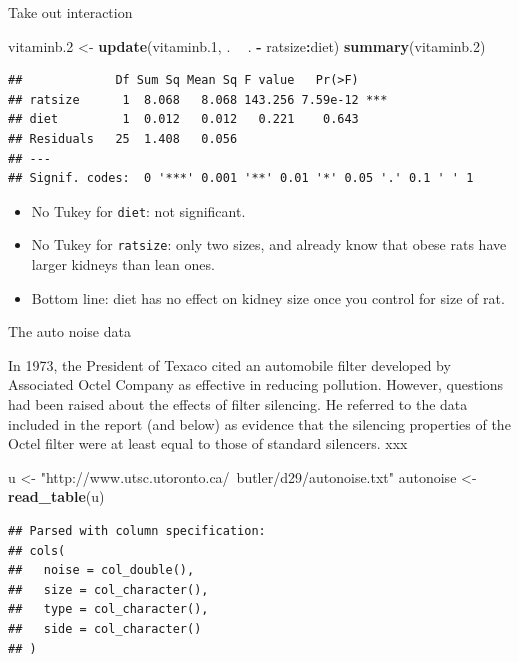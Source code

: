\documentclass[ignorenonframetext,]{beamer}
\newenvironment{Shaded}{\begin{snugshade}}{\end{snugshade}}
\newcommand{\FloatTok}[1]{\textcolor[rgb]{0.00,0.00,0.81}{#1}}
\newcommand{\KeywordTok}[1]{\textcolor[rgb]{0.13,0.29,0.53}{\textbf{#1}}}
\newcommand{\NormalTok}[1]{#1}
\newcommand{\OperatorTok}[1]{\textcolor[rgb]{0.81,0.36,0.00}{\textbf{#1}}}
\newcommand{\StringTok}[1]{\textcolor[rgb]{0.31,0.60,0.02}{#1}}
\begin{document}
\begin{frame}[fragile]{Take out interaction}
\protect\hypertarget{take-out-interaction}{}

\small

\begin{Shaded}
\begin{Highlighting}[]
\NormalTok{vitaminb}\FloatTok{.2}\NormalTok{ <-}\StringTok{ }\KeywordTok{update}\NormalTok{(vitaminb}\FloatTok{.1}\NormalTok{, . }\OperatorTok{~}\StringTok{ }\NormalTok{. }\OperatorTok{-}\StringTok{ }\NormalTok{ratsize}\OperatorTok{:}\NormalTok{diet)}
\KeywordTok{summary}\NormalTok{(vitaminb}\FloatTok{.2}\NormalTok{)}
\end{Highlighting}
\end{Shaded}

\begin{verbatim}
##             Df Sum Sq Mean Sq F value   Pr(>F)    
## ratsize      1  8.068   8.068 143.256 7.59e-12 ***
## diet         1  0.012   0.012   0.221    0.643    
## Residuals   25  1.408   0.056                     
## ---
## Signif. codes:  0 '***' 0.001 '**' 0.01 '*' 0.05 '.' 0.1 ' ' 1
\end{verbatim}

\normalsize

\begin{itemize}
\item
  No Tukey for \texttt{diet}: not significant.
\item
  No Tukey for \texttt{ratsize}: only two sizes, and already know that
  obese rats have larger kidneys than lean ones.
\item
  Bottom line: diet has no effect on kidney size once you control for
  size of rat.
\end{itemize}

\end{frame}

\begin{frame}[fragile]{The auto noise data}
\protect\hypertarget{the-auto-noise-data}{}

In 1973, the President of Texaco cited an automobile filter developed by
Associated Octel Company as effective in reducing pollution. However,
questions had been raised about the effects of filter silencing. He
referred to the data included in the report (and below) as evidence that
the silencing properties of the Octel filter were at least equal to
those of standard silencers. xxx

\begin{Shaded}
\begin{Highlighting}[]
\NormalTok{u <-}\StringTok{ "http://www.utsc.utoronto.ca/~butler/d29/autonoise.txt"}
\NormalTok{autonoise <-}\StringTok{ }\KeywordTok{read_table}\NormalTok{(u)}
\end{Highlighting}
\end{Shaded}

\begin{verbatim}
## Parsed with column specification:
## cols(
##   noise = col_double(),
##   size = col_character(),
##   type = col_character(),
##   side = col_character()
## )
\end{verbatim}

\end{frame}
\end{document}
